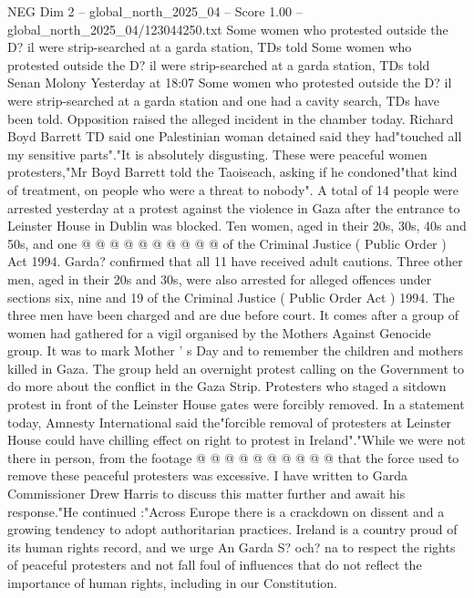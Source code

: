 \begin{textsample}{NEG Dim 2 – global\_north\_2025\_04 – Score 1.00 – global\_north\_2025\_04/123044250.txt}  \label{ex:f2_neg_014}
Some women who protested outside the D? il were strip-searched at a garda station, TDs told Some women who protested outside the D? il were strip-searched at a garda station, TDs told Senan Molony Yesterday at 18:07 Some women who protested outside the D? il were strip-searched at a garda station and one had a cavity search, TDs have been told.
Opposition raised the alleged incident in the chamber today.
Richard Boyd Barrett TD said one Palestinian woman detained said they had"touched all my sensitive parts"."It is absolutely disgusting.
These were peaceful women protesters,"Mr Boyd Barrett told the Taoiseach, asking if he condoned"that kind of treatment, on people who were a threat to nobody".
A total of 14 people were arrested yesterday at a protest against the violence in Gaza after the entrance to Leinster House in Dublin was blocked.
Ten women, aged in their 20s, 30s, 40s and 50s, and one @ @ @ @ @ @ @ @ @ @ of the Criminal Justice ( Public Order ) Act 1994.
Garda? confirmed that all 11 have received adult cautions.
Three other men, aged in their 20s and 30s, were also arrested for alleged offences under sections six, nine and 19 of the Criminal Justice ( Public Order Act ) 1994.
The three men have been charged and are due before court.
It comes after a group of women had gathered for a vigil organised by the Mothers Against Genocide group.
It was to mark Mother ' s Day and to remember the children and mothers killed in Gaza.
The group held an overnight protest calling on the Government to do more about the conflict in the Gaza Strip.
Protesters who staged a sitdown protest in front of the Leinster House gates were forcibly removed.
In a statement today, Amnesty International said the"forcible removal of protesters at Leinster House could have chilling effect on right to protest in Ireland"."While we were not there in person, from the footage @ @ @ @ @ @ @ @ @ @ that the force used to remove these peaceful protesters was excessive.
I have written to Garda Commissioner Drew Harris to discuss this matter further and await his response."He continued :"Across Europe there is a crackdown on dissent and a growing tendency to adopt authoritarian practices.
Ireland is a country proud of its human rights record, and we urge An Garda S? och? na to respect the rights of peaceful protesters and not fall foul of influences that do not reflect the importance of human rights, including in our Constitution.

\end{textsample}
